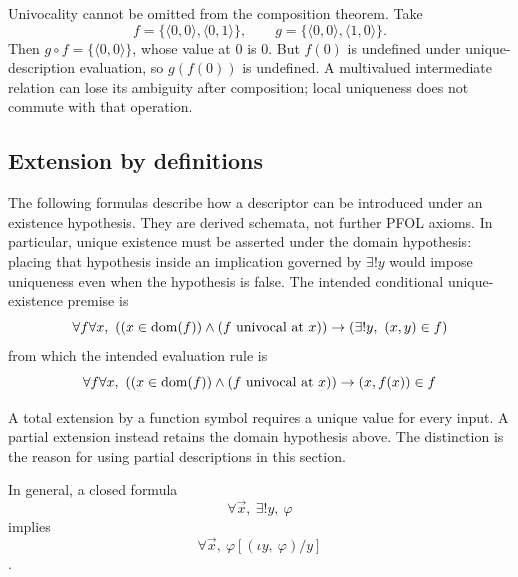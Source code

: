 Univocality cannot be omitted from the composition theorem. Take
\[
f=\{\langle0,0\rangle,\langle0,1\rangle\},\qquad
 g=\{\langle0,0\rangle,\langle1,0\rangle\}.
\]
Then $g\circ f=\{\langle0,0\rangle\}$, whose value at $0$ is $0$.
But $f(0)$ is undefined under unique-description evaluation, so
$g(f(0))$ is undefined. A multivalued intermediate relation can lose
its ambiguity after composition; local uniqueness does not commute with
that operation.

\subsection{Extension by definitions}
The following formulas describe how a descriptor can be introduced under
an existence hypothesis. They are derived schemata, not further PFOL axioms.
In particular, unique existence must be asserted under the domain
hypothesis: placing that hypothesis inside an implication governed by
$\exists!y$ would impose uniqueness even when the hypothesis is false.
\pagebreak
The intended conditional unique-existence premise is
\[
\forall f \forall x,\ ((x\in \mathrm{dom}(f))\land (f\mbox{ univocal at }x)) \to (\exists! y,\ (x,y)\in f)
\]
from which the intended evaluation rule is
\[
\forall f \forall x,\ ((x\in \mathrm{dom}(f))\land (f\mbox{ univocal at }x)) \to (x,f(x))\in f
\]

A total extension by a function symbol requires a unique value for every
input. A partial extension instead retains the domain hypothesis above.
The distinction is the reason for using partial descriptions in this section.

In general, a closed formula
\[
\forall \vec{x} ,\ \exists! y,\ \varphi
\]
implies
\[
\forall \vec{x} ,\ \varphi[(\iota y,\ \varphi)/y]
\]
.

